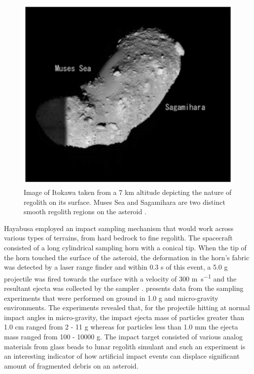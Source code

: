\begin{figure}[htb]
\centering
\captionsetup{justification=centering}
\includegraphics[width=\linewidth, height=0.4\textheight, keepaspectratio=true]{itokawa_regolith.pdf}
\caption{Image of Itokawa taken from a 7 \si{\kilo\metre} altitude depicting the nature of regolith on its surface. Muses Sea and Sagamihara are two distinct smooth regolith regions on the asteroid \parencite{fujiwara2006ItokawaHayabusa}.}
\label{fig:itokawa_regolith}
\end{figure}
\FloatBarrier
Hayabusa employed an impact sampling mechanism that would work across various types of terrains, from hard bedrock to fine regolith. The spacecraft consisted of a long cylindrical sampling horn with a conical tip. When the tip of the horn touched the surface of the asteroid, the deformation in the horn's fabric was detected by a laser range finder and within 0.3 \si{\second} of this event, a 5.0 \si{\gram} projectile was fired towards the surface with a velocity of 300 \si{\metre\per\second} and the resultant ejecta was collected by the sampler \parencite{yano2004sampling}. \cite{yanoHayabusaTouchdown} presents data from the sampling experiments that were performed on ground in 1.0 \si{\gram} and micro-gravity environments. The experiments revealed that, for the projectile hitting at normal impact angles in micro-gravity, the impact ejecta mass of particles greater than 1.0 \si{\centi\metre} ranged from 2 - 11 \si{\gram} whereas for particles less than 1.0 \si{\milli\metre} the ejecta mass ranged from 100 - 10000 \si{\gram}. The impact target consisted of various analog materials from glass beads to lunar regolith simulant and such an experiment is an interesting indicator of how artificial impact events can displace significant amount of fragmented debris on an asteroid.

